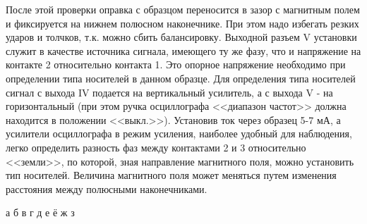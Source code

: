 После этой проверки оправка с образцом переносится в зазор с магнитным полем и фиксируется на нижнем полюсном наконечнике. При этом надо избегать резких ударов и толчков, т.к. можно сбить балансировку. Выходной разъем V установки служит в качестве источника сигнала, имеющего ту же фазу, что и напряжение на контакте 2 относительно контакта 1. Это опорное напряжение необходимо при определении типа носителей в данном образце. Для определения типа носителей сигнал с выхода IV подается на вертикальный усилитель, а с выхода V - на горизонтальный (при этом ручка осциллографа <<диапазон частот>> должна находится в положении <<выкл.>>). Установив ток через образец 5-7 мА, а усилители осциллографа в режим усиления, наиболее удобный для наблюдения, легко определить разность фаз между контактами 2 и 3 относительно <<земли>>, по которой, зная направление магнитного поля, можно установить тип носителей. Величина магнитного поля может меняться путем изменения расстояния между полюсными наконечниками. 


\begin{thebibliography}{}
	 а
	 б
	 в
	 г
	 д
	 е
	 ё
	 ж
	 з
\end{thebibliography}


